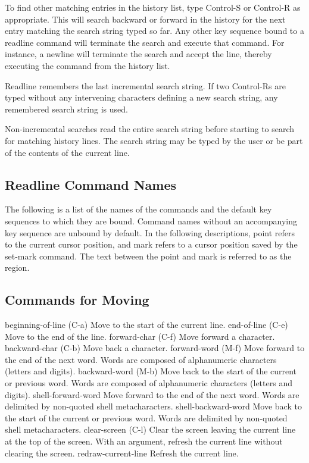 To find other matching entries in the history list, type Control-S or Control-R as appropriate. This will search backward or forward in the history for the next entry matching the search string typed so far. Any other key sequence bound to a readline command will terminate the search and execute that command. For instance, a newline will terminate the search and accept the line, thereby executing the command from the history list.

Readline remembers the last incremental search string. If two Control-Rs are typed without any intervening characters defining a new search string, any remembered search string is used.

Non-incremental searches read the entire search string before starting to search for matching history lines. The search string may be typed by the user or be part of the contents of the current line.

\subsection{Readline Command Names}\label{sec:readlinecommandnames}

The following is a list of the names of the commands and the default key sequences to which they are bound. Command names without an accompanying key sequence are unbound by default. In the following descriptions, point refers to the current cursor position, and mark refers to a cursor position saved by the set-mark command. The text between the point and mark is referred to as the region.
\subsection{Commands for Moving}\label{sec:commandsformoving}

beginning-of-line (C-a)
Move to the start of the current line.
end-of-line (C-e)
Move to the end of the line.
forward-char (C-f)
Move forward a character.
backward-char (C-b)
Move back a character.
forward-word (M-f)
Move forward to the end of the next word. Words are composed of alphanumeric characters (letters and digits).
backward-word (M-b)
Move back to the start of the current or previous word. Words are composed of alphanumeric characters (letters and digits).
shell-forward-word
Move forward to the end of the next word. Words are delimited by non-quoted shell metacharacters.
shell-backward-word
Move back to the start of the current or previous word. Words are delimited by non-quoted shell metacharacters.
clear-screen (C-l)
Clear the screen leaving the current line at the top of the screen. With an argument, refresh the current line without clearing the screen.
redraw-current-line
Refresh the current line.
